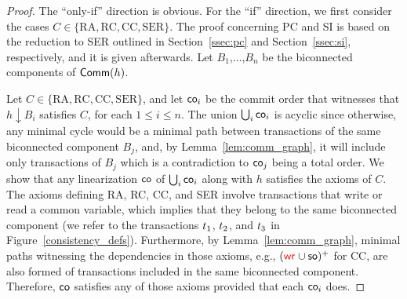 \begin{proof}
The ``only-if'' direction is obvious. For the ``if'' direction, we first consider the cases $C\in\{\text{RA},\text{RC},\text{CC},\text{SER}\}$. The proof concerning PC and SI is based on the reduction to SER outlined in Section~\ref{ssec:pc} and Section~\ref{ssec:si}, respectively, and it is given afterwards. Let $B_1$,$\ldots$,$B_n$ be the biconnected components of $\mathsf{Comm}({h})$.

Let $C\in\{\text{RA},\text{RC},\text{CC},\text{SER}\}$, and let $\mathsf{co}_i$ be the commit order that witnesses that $h\downarrow B_i$ satisfies $C$, for each $1\leq i\leq n$. The union $\bigcup_i\mathsf{co}_i$ is acyclic since otherwise, any minimal cycle would be a minimal path between transactions of the same biconnected component $B_j$, and, by Lemma~\ref{lem:comm_graph}, it will include only transactions of $B_j$ which is a contradiction to $\mathsf{co}_j$ being a total order. We show that any linearization $\mathsf{co}$ of $\bigcup_i\mathsf{co}_i$ along with $h$ satisfies the axioms of $C$. The axioms defining RA, RC, CC, and SER involve transactions that write or read a common variable, which implies that they belong to the same biconnected component (we refer to the transactions ${t}_1$, ${t}_2$, and ${t}_3$ in Figure~\ref{consistency_defs}). Furthermore, by Lemma~\ref{lem:comm_graph}, minimal paths witnessing the dependencies in those axioms, e.g., $(\textcolor{red}{\mathsf{wr}_{}} \cup \mathsf{so})^+$ for CC, are also formed of transactions included in the same biconnected component. Therefore, $\mathsf{co}$ satisfies any of those axioms provided that each $\mathsf{co}_i$ does.




\end{proof}

